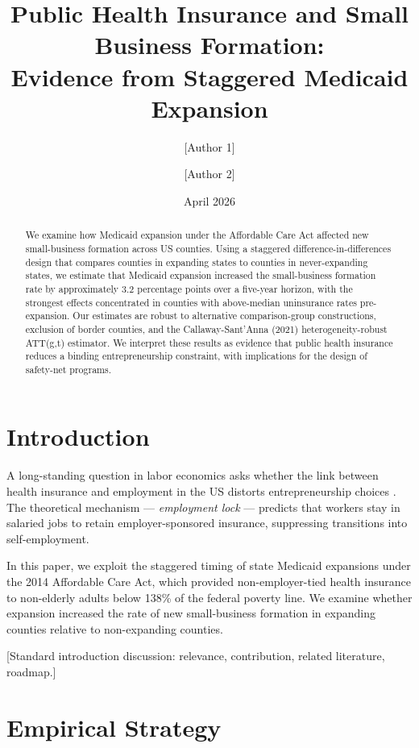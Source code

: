\documentclass[11pt]{article}
\title{Public Health Insurance and Small Business Formation: \\
       Evidence from Staggered Medicaid Expansion}
\author{[Author 1] \and [Author 2]}
\date{April 2026}
\begin{document}
\maketitle

\begin{abstract}
We examine how Medicaid expansion under the Affordable Care Act affected new
small-business formation across US counties. Using a staggered difference-in-differences
design that compares counties in expanding states to counties in never-expanding states,
we estimate that Medicaid expansion increased the small-business formation rate by
approximately 3.2 percentage points over a five-year horizon, with the strongest effects
concentrated in counties with above-median uninsurance rates pre-expansion. Our estimates
are robust to alternative comparison-group constructions, exclusion of border counties,
and the Callaway-Sant'Anna (2021) heterogeneity-robust ATT(g,t) estimator. We interpret
these results as evidence that public health insurance reduces a binding entrepreneurship
constraint, with implications for the design of safety-net programs.
\end{abstract}

\section{Introduction}

A long-standing question in labor economics asks whether the link between health
insurance and employment in the US distorts entrepreneurship choices \citep{MaduraEtAl2014,
GarthwaiteGrossNotowidigdo2014}. The theoretical mechanism — \emph{employment lock} —
predicts that workers stay in salaried jobs to retain employer-sponsored insurance,
suppressing transitions into self-employment.

In this paper, we exploit the staggered timing of state Medicaid expansions under the
2014 Affordable Care Act, which provided non-employer-tied health insurance to non-elderly
adults below 138\% of the federal poverty line. We examine whether expansion increased
the rate of new small-business formation in expanding counties relative to non-expanding
counties.

[Standard introduction discussion: relevance, contribution, related literature, roadmap.]

\section{Empirical Strategy}
\end{document}
